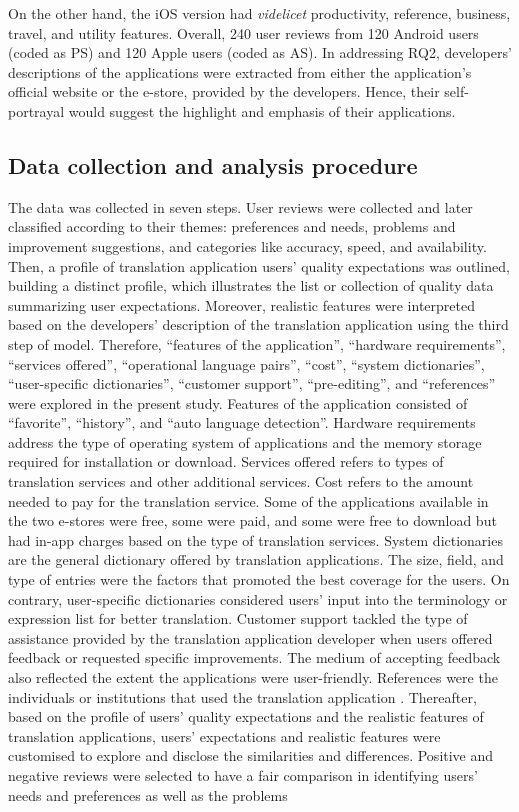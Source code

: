 \documentclass[english]{textolivre}
\begin{document}
On the other hand, the iOS version had \textit{videlicet} productivity, reference, business, travel, and utility features. Overall, 240 user reviews from 120 Android users (coded as PS) and 120 Apple users (coded as AS). In addressing RQ2, developers’ descriptions of the applications were extracted from either the application’s official website or the e-store, provided by the developers. Hence, their self-portrayal would suggest the highlight and emphasis of their applications.

\subsection{Data collection and analysis procedure}\label{sec-idioma}
The data was collected in seven steps. User reviews were collected and later classified according to their themes: preferences and needs, problems and improvement suggestions, and categories like accuracy, speed, and availability. Then, a profile of translation application users’ quality expectations was outlined, building a distinct profile, which illustrates the list or collection of quality data summarizing user expectations. Moreover, realistic features were interpreted based on the developers’ description of the translation application using the third step of  model. Therefore, “features of the application”, “hardware requirements”, “services offered”, “operational language pairs”, “cost”, “system dictionaries”, “user-specific dictionaries”, “customer support”, “pre-editing”, and “references” were explored in the present study. Features of the application consisted of “favorite”, “history”, and “auto language detection”. Hardware requirements address the type of operating system of applications and the memory storage required for installation or download. Services offered refers to types of translation services and other additional services. Cost refers to the amount needed to pay for the translation service. Some of the applications available in the two e-stores were free, some were paid, and some were free to download but had in-app charges based on the type of translation services. System dictionaries are the general dictionary offered by translation applications. The size, field, and type of entries were the factors that promoted the best coverage for the users. On contrary, user-specific dictionaries considered users’ input into the terminology or expression list for better translation. Customer support tackled the type of assistance provided by the translation application developer when users offered feedback or requested specific improvements. The medium of accepting feedback also reflected the extent the applications were user-friendly. References were the individuals or institutions that used the translation application \cite{ryan_machine_1993}. Thereafter, based on the profile of users’ quality expectations and the realistic features of translation applications, users’ expectations and realistic features were customised to explore and disclose the similarities and differences. Positive and negative reviews were selected to have a fair comparison in identifying users’ needs and preferences as well as the problems 
\end{document}
